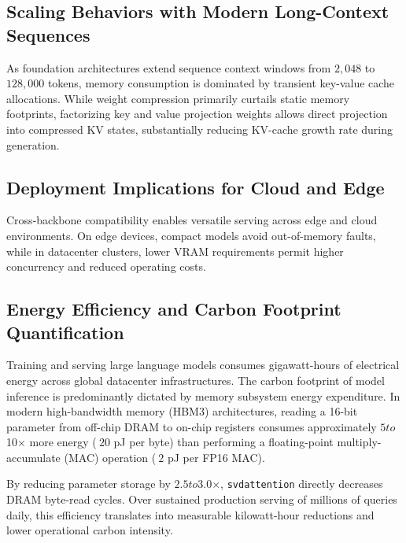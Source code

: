 \subsection{Scaling Behaviors with Modern Long-Context Sequences}
As foundation architectures extend sequence context windows from $2{,}048$ to $128{,}000$ tokens, memory consumption is dominated by transient key-value cache allocations. While weight compression primarily curtails static memory footprints, factorizing key and value projection weights allows direct projection into compressed KV states, substantially reducing KV-cache growth rate during generation.

\subsection{Deployment Implications for Cloud and Edge}
Cross-backbone compatibility enables versatile serving across edge and cloud environments. On edge devices, compact models avoid out-of-memory faults, while in datacenter clusters, lower VRAM requirements permit higher concurrency and reduced operating costs.

\subsection{Energy Efficiency and Carbon Footprint Quantification}
Training and serving large language models consumes gigawatt-hours of electrical energy across global datacenter infrastructures. The carbon footprint of model inference is predominantly dictated by memory subsystem energy expenditure. In modern high-bandwidth memory (HBM3) architectures, reading a 16-bit parameter from off-chip DRAM to on-chip registers consumes approximately $5$\times$ to $10$\times$ more energy ($~20$ pJ per byte) than performing a floating-point multiply-accumulate (MAC) operation ($~2$ pJ per FP16 MAC).

By reducing parameter storage by $2.5$\times$ to $3.0$\times$, \texttt{svdattention} directly decreases DRAM byte-read cycles. Over sustained production serving of millions of queries daily, this efficiency translates into measurable kilowatt-hour reductions and lower operational carbon intensity.
